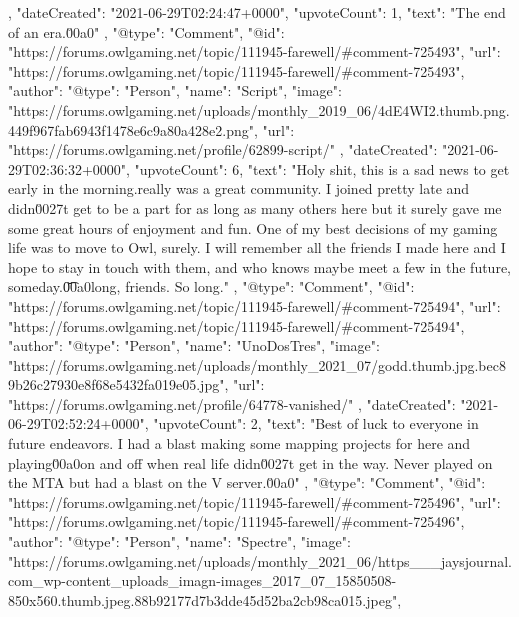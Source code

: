 {{{            },
            "dateCreated": "2021-06-29T02:24:47+0000",
            "upvoteCount": 1,
            "text": "The end of an era.\u00a0\n \n"
        },
        {
            "@type": "Comment",
            "@id": "https://forums.owlgaming.net/topic/111945-farewell/#comment-725493",
            "url": "https://forums.owlgaming.net/topic/111945-farewell/#comment-725493",
            "author": {
                "@type": "Person",
                "name": "Script",
                "image": "https://forums.owlgaming.net/uploads/monthly_2019_06/4dE4WI2.thumb.png.449f967fab6943f1478e6c9a80a428e2.png",
                "url": "https://forums.owlgaming.net/profile/62899-script/"
            },
            "dateCreated": "2021-06-29T02:36:32+0000",
            "upvoteCount": 6,
            "text": "Holy shit, this is a sad news to get early in the morning.\n \n\n\n\tOwl really was a great community. I joined pretty late and didn\u0027t get to be a part for as long as many others here but it surely gave me some great hours of enjoyment and fun. One of my best decisions of my gaming life was to move to Owl, surely. I will remember all the friends I made here and I hope to stay in touch with them, and who knows maybe meet a few in the future, someday.\n \n\n\n\t\u00a0\n \n\n\n\tSo long, friends. So long.\n \n"
        },
        {
            "@type": "Comment",
            "@id": "https://forums.owlgaming.net/topic/111945-farewell/#comment-725494",
            "url": "https://forums.owlgaming.net/topic/111945-farewell/#comment-725494",
            "author": {
                "@type": "Person",
                "name": "UnoDosTres",
                "image": "https://forums.owlgaming.net/uploads/monthly_2021_07/godd.thumb.jpg.bec89b26c27930e8f68e5432fa019e05.jpg",
                "url": "https://forums.owlgaming.net/profile/64778-vanished/"
            },
            "dateCreated": "2021-06-29T02:52:24+0000",
            "upvoteCount": 2,
            "text": "Best of luck to everyone in future endeavors. I had a blast making some mapping projects for here and playing\u00a0on and off when real life didn\u0027t get in the way. Never played on the MTA but had a blast on the V server.\u00a0\n \n"
        },
        {
            "@type": "Comment",
            "@id": "https://forums.owlgaming.net/topic/111945-farewell/#comment-725496",
            "url": "https://forums.owlgaming.net/topic/111945-farewell/#comment-725496",
            "author": {
                "@type": "Person",
                "name": "Spectre",
                "image": "https://forums.owlgaming.net/uploads/monthly_2021_06/https___jaysjournal.com_wp-content_uploads_imagn-images_2017_07_15850508-850x560.thumb.jpeg.88b92177d7b3dde45d52ba2cb98ca015.jpeg",
}}}

